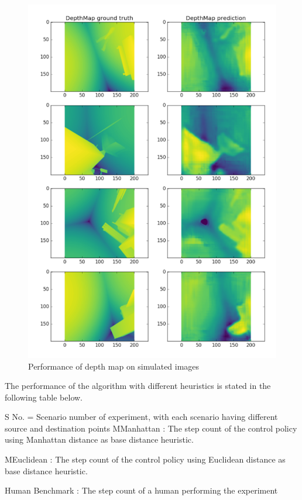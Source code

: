\begin{figure}
  \includegraphics[width=\linewidth]{images/depthmap2.png}
  \caption{Performance of depth map on simulated images}
  \label{fig:depthmap2}
\end{figure}

The performance of the algorithm with different heuristics is stated in the following table below.
 
S No. = Scenario number of experiment, with each scenario having different source and destination points
MManhattan : The step count of the control policy using Manhattan distance as base distance heuristic.
 
MEuclidean : The step count of the control policy using Euclidean distance as base distance heuristic.
 
Human Benchmark : The step count of a human performing the experiment
 
